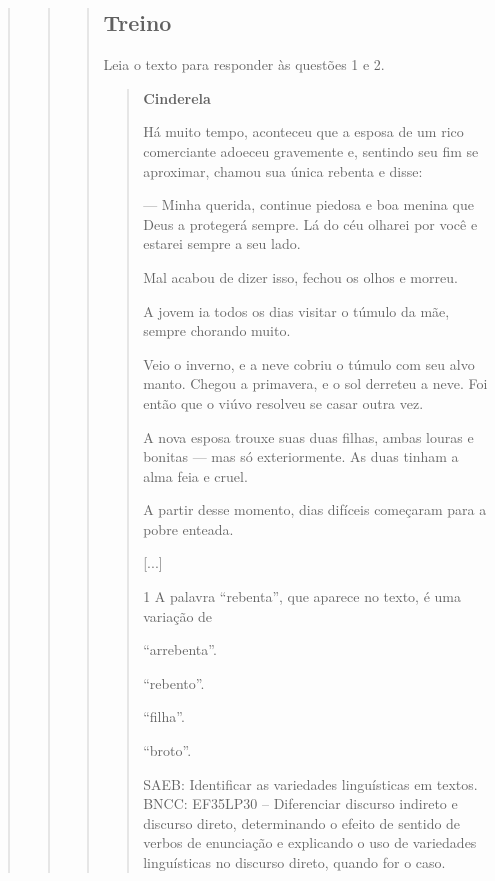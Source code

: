 \begin{quote}
\begin{quote}
\begin{quote}

\subsection{Treino}\label{treino-5}

Leia o texto para responder às questões 1 e 2.

\begin{quote}
\textbf{Cinderela}

Há muito tempo, aconteceu que a esposa de um rico
comerciante adoeceu gravemente e, sentindo seu fim se
aproximar, chamou sua única rebenta e disse:

--- Minha querida, continue piedosa e boa menina que
Deus a protegerá sempre. Lá do céu olharei por você e estarei
sempre a seu lado.

Mal acabou de dizer isso, fechou os olhos e morreu.

A jovem ia todos os dias visitar o túmulo da mãe,
sempre chorando muito.

Veio o inverno, e a neve cobriu o túmulo com seu alvo
manto. Chegou a primavera, e o sol derreteu a neve. Foi então
que o viúvo resolveu se casar outra vez.

A nova esposa trouxe suas duas filhas, ambas louras e
bonitas --- mas só exteriormente. As duas tinham a alma feia
e cruel.

A partir desse momento, dias difíceis começaram para
a pobre enteada.

{[}...{]}


\num{1} A palavra ``rebenta'', que aparece no texto, é uma variação de

\begin{escolha}
\item ``arrebenta''.
\item ``rebento''.
\item ``filha''.
\item ``broto''.
\end{escolha}

SAEB: Identificar as variedades linguísticas em textos.
BNCC: EF35LP30 -- Diferenciar discurso indireto e discurso direto,
determinando o efeito de sentido de verbos de enunciação e explicando o
uso de variedades linguísticas no discurso direto, quando for o caso.


\end{quote}
\end{quote}
\end{quote}
\end{quote}
